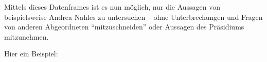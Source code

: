 \documentclass[oneside, 12pt]{scrbook}
\newenvironment{Shaded}{\begin{snugshade}}{\end{snugshade}}
\newcommand{\DataTypeTok}[1]{\textcolor[rgb]{0.13,0.29,0.53}{#1}}
\newcommand{\KeywordTok}[1]{\textcolor[rgb]{0.13,0.29,0.53}{\textbf{#1}}}
\newcommand{\NormalTok}[1]{#1}
\newcommand{\OperatorTok}[1]{\textcolor[rgb]{0.81,0.36,0.00}{\textbf{#1}}}
\newcommand{\OtherTok}[1]{\textcolor[rgb]{0.56,0.35,0.01}{#1}}
\newcommand{\StringTok}[1]{\textcolor[rgb]{0.31,0.60,0.02}{#1}}
\theoremstyle{definition}
\theoremstyle{definition}
\theoremstyle{definition}
\theoremstyle{remark}
\begin{document}
Mittels dieses Datenframes ist es nun möglich, nur die Aussagen von
beispielsweise Andrea Nahles zu untersuchen -- ohne Unterbrechungen und
Fragen von anderen Abgeordneten ``mitzuschneiden'' oder Aussagen des
Präsidiums mitzunehmen.

Hier ein Beispiel:

\begin{Shaded}
\end{Shaded}
\end{document}
